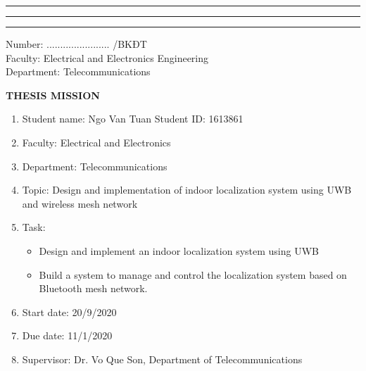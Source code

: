 \documentclass[\main/thesis.tex]{subfiles}
\begin{document}
\graphicspath{{imgs/}{00_misc/imgs/}}


\rule{\textwidth}{1pt}
\begin{minipage}{0.45\textwidth}
    \vspace{3mm}
    \begin{center}
        \fontsize{7}{12}\selectfont{VIETNAM NATIONAL UNIVERSITY HO CHI MINH CITY\\
                 HO CHI MINH CITY UNIVERSITY OF TECHNOLOGY\\}
    \rule{\textwidth}{1pt}
    \end{center}
\end{minipage}
\hfill
\begin{minipage}{0.45\textwidth}
    \vspace{3mm}
    \begin{center}
        \fontsize{7}{12}\selectfont{SOCIALIST REPUBLIC OF VIETNAM\\
    INDEPENDENCE-FREEDOM-HAPPINESS\\}
    \rule{\textwidth}{1pt}
    \end{center}
\end{minipage}

\begin{flushleft}
    \parbox[t][1.5cm]{10cm}
    {
        Number: ....................... /BKĐT \\
        Faculty: Electrical and Electronics Engineering \\
        Department: Telecommunications
    }
\end{flushleft}

\vspace{3mm}
\begin{center}
    \textbf{THESIS MISSION}
\end{center}
\vspace{3mm}

\begin{enumerate}
    \item Student name: Ngo Van Tuan \hspace{3cm} Student ID: 1613861
    \item Faculty: Electrical and Electronics
    \item Department: Telecommunications
    \item Topic: Design and implementation of indoor localization system using UWB and wireless mesh network 
    \item Task: \begin{itemize}
        \item Design and implement an indoor localization system using UWB
        \item Build a system to manage and control the localization system based on Bluetooth mesh network.
    \end{itemize}
    \item Start date: 20/9/2020
    \item Due date: 11/1/2020
    \item Supervisor: Dr. Vo Que Son, Department of Telecommunications
\end{enumerate}
\end{document}
